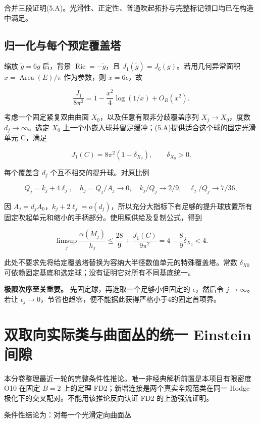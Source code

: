 \documentclass[UTF8,11pt,openany,fontset=none]{ctexbook}
\theoremstyle{definition}
\theoremstyle{remark}
\begin{document}
合并三段证明(5.A)。光滑性、正定性、普通吹起拓扑与完整标记领口均已在构造中满足。

\section{归一化与每个预定覆盖塔}\label{v5-ux5f52ux4e00ux5316ux4e0eux6bcfux4e2aux9884ux5b9aux8986ux76d6ux5854}

缩放 \(\widetilde g=6g\) 后，背景 \(\operatorname{Ric}=-\widetilde g\)，且 \(J_1(\widetilde g)=J_6(g)\)。若用几何异常面积 \(x=\operatorname{Area}(E)/\pi\) 作为参数，则 \(x=6\epsilon\)，故

\[
\frac{J_1}{8\pi^2}
=1-\frac{x^2}{4}\log(1/x)+O_R(x^2).
\]

考虑一个固定紧复双曲曲面 \(X_0\)，以及任意有限非分歧覆盖序列 \(X_j\to X_0\)，度数 \(d_j\to \infty\)。选定 \(X_0\) 上一个小嵌入球并留足缓冲；(5.A)提供适合这个球的固定光滑单元 C，满足

\[
 J_1(C)=8\pi^2(1-\delta_{X_0}),\qquad\delta_{X_0}>0.
\]

每个覆盖含 \(d_j\) 个互不相交的提升球。对原比例

\[
 Q_j=k_j+4\ell_j,\quad h_j=Q_j/A_j\to0,\quad
 k_j/Q_j\to2/9,\quad \ell_j/Q_j\to7/36,
\]

因 \(A_j=d_jA_0\)，\(k_j+2\ell _j=o(d_j)\)，所以充分大指标下有足够的提升球放置所有固定吹起单元和缩小的手柄部分。使用原供给及复制公式，得到

\[
\boxed{
\limsup_j\frac{\alpha(M_j)}{h_j}
\le\frac{28}{9}+\frac{J_1(C)}{9\pi^2}
=4-\frac89\delta_{X_0}<4.
}
\tag{5.6.1}
\]

此处不要求先将给定覆盖塔替换为容纳大半径数值单元的特殊覆盖塔。常数 \(\delta _{X0}\) 可依赖固定基底和选定球；没有证明它对所有不同基底统一。

\textbf{极限次序至关重要。} 先固定球，再选取一个足够小但固定的 \(\epsilon\)，然后令 \(j\to \infty\)。若让 \(\epsilon _j\to 0\)，节省也趋零，便不能据此获得严格小于4的固定首项界。


\chapter{双取向实际类与曲面丛的统一 Einstein 间隙}
本分卷整理最近一轮的完整条件性推论。唯一非经典解析前置是本项目有限密度 O10 在固定 \(B=2\) 上的定理 FD2；新增连接是两个真实辛规范类在同一 Hodge 极化下的交叉配对。不能用该推论反向认证 FD2 的上游强流证明。\cite{R05,I02,Kotschick1999,LeBrun2000}

条件性结论为：对每一个光滑定向曲面丛
\end{document}
